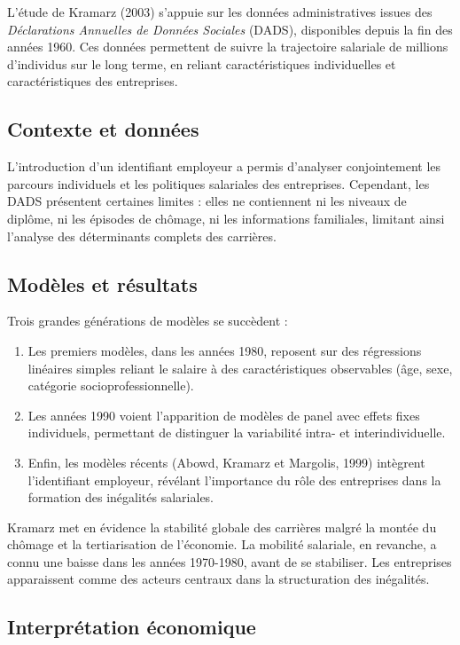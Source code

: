 \documentclass[12pt,a4paper]{article}
\begin{document}
L’étude de Kramarz (2003) s’appuie sur les données administratives issues des \textit{Déclarations Annuelles de Données Sociales} (DADS), disponibles depuis la fin des années 1960. 
Ces données permettent de suivre la trajectoire salariale de millions d’individus sur le long terme, en reliant caractéristiques individuelles et caractéristiques des entreprises.

\subsection{Contexte et données}

L’introduction d’un identifiant employeur a permis d’analyser conjointement les parcours individuels et les politiques salariales des entreprises. 
Cependant, les DADS présentent certaines limites : elles ne contiennent ni les niveaux de diplôme, ni les épisodes de chômage, ni les informations familiales, limitant ainsi l’analyse des déterminants complets des carrières.

\subsection{Modèles et résultats}

Trois grandes générations de modèles se succèdent :
\begin{enumerate}
    \item Les premiers modèles, dans les années 1980, reposent sur des régressions linéaires simples reliant le salaire à des caractéristiques observables (âge, sexe, catégorie socioprofessionnelle).
    \item Les années 1990 voient l’apparition de modèles de panel avec effets fixes individuels, permettant de distinguer la variabilité intra- et interindividuelle.
    \item Enfin, les modèles récents (Abowd, Kramarz et Margolis, 1999) intègrent l’identifiant employeur, révélant l’importance du rôle des entreprises dans la formation des inégalités salariales.
\end{enumerate}

Kramarz met en évidence la stabilité globale des carrières malgré la montée du chômage et la tertiarisation de l’économie. 
La mobilité salariale, en revanche, a connu une baisse dans les années 1970-1980, avant de se stabiliser. 
Les entreprises apparaissent comme des acteurs centraux dans la structuration des inégalités.

\subsection{Interprétation économique}
\end{document}
